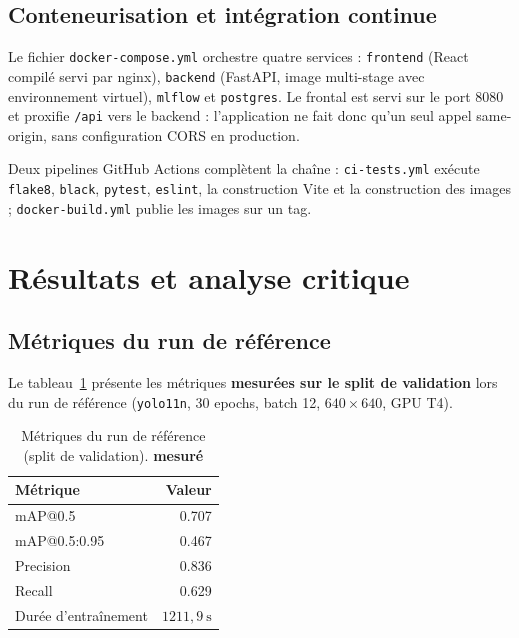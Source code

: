 \documentclass[11pt,a4paper]{article}
\newcommand{\measured}{\textcolor{okgreen}{\textbf{mesuré}}}
\begin{document}
\subsection{Conteneurisation et intégration continue}

Le fichier \texttt{docker-compose.yml} orchestre quatre services :
\texttt{frontend} (React compilé servi par nginx), \texttt{backend}
(FastAPI, image multi-stage avec environnement virtuel), \texttt{mlflow}
et \texttt{postgres}. Le frontal est servi sur le port \(8080\) et
proxifie \texttt{/api} vers le backend : l'application ne fait donc qu'un
seul appel same-origin, sans configuration CORS en production.

Deux pipelines GitHub Actions complètent la chaîne : \texttt{ci-tests.yml}
exécute \texttt{flake8}, \texttt{black}, \texttt{pytest}, \texttt{eslint},
la construction Vite et la construction des images ; \texttt{docker-build.yml}
publie les images sur un tag.

\section{Résultats et analyse critique}

\subsection{Métriques du run de référence}

Le tableau~\ref{tab:val} présente les métriques \textbf{mesurées sur le
split de validation} lors du run de référence (\texttt{yolo11n}, 30 epochs,
batch 12, \(640 \times 640\), GPU T4).

\begin{table}[H]
\centering
\caption{Métriques du run de référence (split de validation). \measured}
\label{tab:val}
\begin{tabular}{@{}lr@{}}
\toprule
\textbf{Métrique} & \textbf{Valeur} \\
\midrule
mAP@0.5        & 0.707 \\
mAP@0.5:0.95   & 0.467 \\
Precision      & 0.836 \\
Recall         & 0.629 \\
Durée d'entraînement & \(1211{,}9\ \mathrm{s}\) \\
\bottomrule
\end{tabular}
\end{table}
\end{document}
